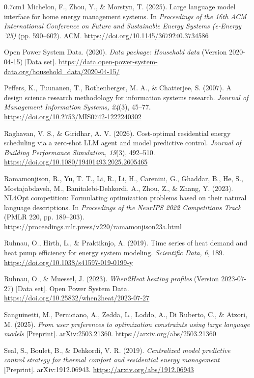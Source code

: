 \begin{hangparas}{0.7cm}{1}
Michelon, F., Zhou, Y., \& Morstyn, T. (2025). Large language model
interface for home energy management systems. In \textit{Proceedings of
the 16th ACM International Conference on Future and Sustainable Energy
Systems (e-Energy '25)} (pp. 590--602). ACM.
\url{https://doi.org/10.1145/3679240.3734586}

Open Power System Data. (2020). \textit{Data package: Household data}
(Version 2020-04-15) [Data set].
\url{https://data.open-power-system-data.org/household_data/2020-04-15/}

Peffers, K., Tuunanen, T., Rothenberger, M. A., \& Chatterjee, S.
(2007). A design science research methodology for information systems
research. \textit{Journal of Management Information Systems, 24}(3),
45--77. \url{https://doi.org/10.2753/MIS0742-1222240302}

Raghavan, V. S., \& Giridhar, A. V. (2026). Cost-optimal residential
energy scheduling via a zero-shot LLM agent and model predictive
control. \textit{Journal of Building Performance Simulation, 19}(3),
492--510. \url{https://doi.org/10.1080/19401493.2025.2605465}

Ramamonjison, R., Yu, T. T., Li, R., Li, H., Carenini, G., Ghaddar, B.,
He, S., Mostajabdaveh, M., Banitalebi-Dehkordi, A., Zhou, Z., \& Zhang,
Y. (2023). NL4Opt competition: Formulating optimization problems based
on their natural language descriptions. In \textit{Proceedings of the
NeurIPS 2022 Competitions Track} (PMLR 220, pp. 189--203).
\url{https://proceedings.mlr.press/v220/ramamonjison23a.html}

Ruhnau, O., Hirth, L., \& Praktiknjo, A. (2019). Time series of heat
demand and heat pump efficiency for energy system modeling.
\textit{Scientific Data, 6}, 189.
\url{https://doi.org/10.1038/s41597-019-0199-y}

Ruhnau, O., \& Muessel, J. (2023). \textit{When2Heat heating profiles}
(Version 2023-07-27) [Data set]. Open Power System Data.
\url{https://doi.org/10.25832/when2heat/2023-07-27}

Sanguinetti, M., Perniciano, A., Zedda, L., Loddo, A., Di Ruberto, C.,
\& Atzori, M. (2025). \textit{From user preferences to optimization
constraints using large language models} [Preprint]. arXiv:2503.21360.
\url{https://arxiv.org/abs/2503.21360}

Seal, S., Boulet, B., \& Dehkordi, V. R. (2019). \textit{Centralized
model predictive control strategy for thermal comfort and residential
energy management} [Preprint]. arXiv:1912.06943.
\url{https://arxiv.org/abs/1912.06943}


\end{hangparas}

